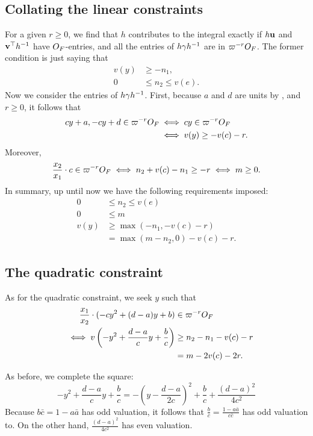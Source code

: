 \subsection{Collating the linear constraints}
For a given $r \ge 0$, we find that $h$ contributes to the integral exactly
if $h\mathbf u$ and $\mathbf v^\top h^{-1}$ have $O_F$-entries,
and all the entries of $h \gamma h^{-1}$ are in $\varpi^{-r}O_F$.
The former condition is just saying that
\begin{align*}
  v(y) &\ge -n_1, \\
  0 &\le n_2 \le v(e).
\end{align*}
Now we consider the entries of $h\gamma h^{-1}$.
First, because $a$ and $d$ are units by ,
and $r \ge 0$, it follows that
\begin{align*}
  cy + a, -cy + d \in \varpi^{-r}O_F
  &\iff cy \in \varpi^{-r}O_F \\
  &\iff v(y) \ge -v(c) - r.
\end{align*}
Moreover,
\[ \frac{x_2}{x_1} \cdot c \in \varpi^{-r} O_F
  \iff n_2 + v(c) -n_1 \ge - r \iff m \ge 0. \]
In summary, up until now we have the following requirements imposed:
\begin{equation}
  \begin{aligned}
  0 &\le n_2 \le v(e) \\
  0 &\le m \\
  v(y) &\ge \max(-n_1, -v(c) - r) \\
  &= \max(m-n_2, 0) - v(c) - r.
  \end{aligned}
  \label{eq:linear_constraints}
\end{equation}

\subsection{The quadratic constraint}
As for the quadratic constraint, we seek $y$ such that
\begin{align*}
  \phantom\iff \frac{x_1}{x_2} \cdot (-cy^2+(d-a)y+b) &\in \varpi^{-r} \OO_F \\
  \iff v\left(-y^2+ \frac{d-a}{c} y + \frac bc \right) &\ge n_2 - n_1 - v(c) - r \\
  &= m - 2v(c) - 2r.
\end{align*}

As before, we complete the square:
\[
  -y^2+ \frac{d-a}{c} y + \frac bc
  = -\left( y - \frac{d-a}{2c} \right)^2 + \frac bc + \frac{(d-a)^2}{4c^2}
\]
Because $b \bar c = 1 - a \bar a$ has odd valuation,
it follows that $\frac b c = \frac{1-a \bar a}{c\bar c}$ has odd valuation to.
On the other hand, $\frac{(d-a)^2}{4c^2}$ has even valuation.


